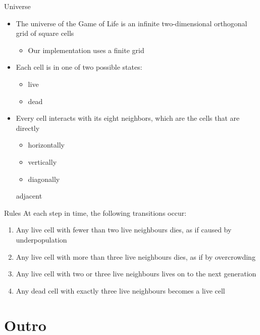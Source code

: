 \begin{frame}{Universe}
  \begin{itemize}
  \item The universe of the Game of Life is an infinite
    two-dimensional orthogonal grid of square cells
    \begin{itemize}
    \item Our implementation uses a finite grid
    \end{itemize}
  \item Each cell is in one of two possible states:
    \begin{itemize}
    \item live
    \item dead
    \end{itemize}
  \item Every cell interacts with its eight neighbors, which are the
    cells that are directly
    \begin{itemize}
    \item horizontally
    \item vertically
    \item diagonally
    \end{itemize}
    adjacent
  \end{itemize}
\end{frame}

\begin{frame}{Rules}
  At each step in time, the following transitions occur:


  \begin{enumerate}
  \item Any live cell with fewer than two live neighbours dies, as if
    caused by underpopulation
  \item Any live cell with more than three live neighbours dies, as if
    by overcrowding
  \item Any live cell with two or three live neighbours lives on to
    the next generation
  \item Any dead cell with exactly three live neighbours becomes a
    live cell
  \end{enumerate}  
\end{frame}


\section*{Outro}

